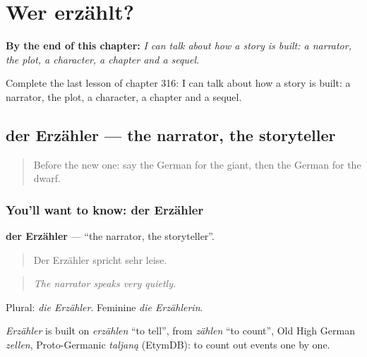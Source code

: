 
\chapter{Wer erzählt?}
\label{ch:ge-wer-erzahlt}

\begin{chapteropening}
\textbf{By the end of this chapter:} \emph{I can talk about how a story is built: a narrator, the plot, a character, a chapter and a sequel.}

Complete the last lesson of chapter 316: I can talk about how a story is built: a narrator, the plot, a character, a chapter and a sequel.
\end{chapteropening}

\section[der Erzähler]{der Erzähler — the narrator, the storyteller}

\label{lesson:GE-C316-erzaehler}



\begin{quote}
Before the new one: say the German for the giant, then the German for the dwarf.
\end{quote}

\subsection*{You'll want to know: der Erzähler}
\textbf{der Erzähler} — \textquotedblleft{}the narrator, the storyteller\textquotedblright{}.

\begin{quote}
Der Erzähler spricht sehr leise.
\end{quote}

\begin{quote}
\emph{The narrator speaks very quietly.}
\end{quote}

Plural: \emph{die Erzähler}. Feminine \emph{die Erzählerin}.

\begin{cousinweb}
\emph{Erzähler} is built on \emph{erzählen} \textquotedblleft{}to tell\textquotedblright{}, from \emph{zählen} \textquotedblleft{}to count\textquotedblright{}, Old High German \emph{zellen}, Proto-Germanic \emph{taljaną} (EtymDB): to count out events one by one.
\end{cousinweb}

